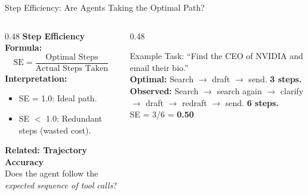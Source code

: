 \documentclass{beamer}       %
\begin{document}
\begin{frame}{Step Efficiency: Are Agents Taking the Optimal Path?}
    \small
    \begin{columns}[T]
        \begin{column}{0.48\textwidth}
            \textbf{Step Efficiency Formula:}
            \[
                \text{SE} = \frac{\text{Optimal Steps}}{\text{Actual Steps Taken}}
            \]
            \textbf{Interpretation:}
            \begin{itemize}
                \item SE = 1.0: Ideal path.
                \item SE $<$ 1.0: Redundant steps (wasted cost).
            \end{itemize}
            \vspace{0.2cm}
            \textbf{Related: Trajectory Accuracy} \\
            Does the agent follow the \textit{expected sequence of tool calls}?
        \end{column}
        \begin{column}{0.48\textwidth}
            \begin{alertblock}{Example}
                \footnotesize
                Task: ``Find the CEO of NVIDIA and email their bio.''\\[4pt]
                \textbf{Optimal:} Search $\to$ draft $\to$ send. \textbf{3 steps.}\\[4pt]
                \textbf{Observed:} Search $\to$ search again $\to$ clarify $\to$ draft $\to$ redraft $\to$ send. \textbf{6 steps.}\\[4pt]
                SE = 3/6 = \textbf{0.50}
            \end{alertblock}
        \end{column}
    \end{columns}
\end{frame}
\end{document}
